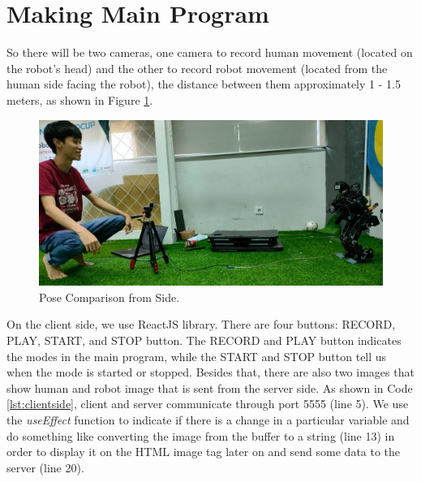 \section{Making Main Program}
\label{sec:makingmainprogram}

So there will be two cameras, one camera to record human movement (located on the robot's head) and the other to record robot movement (located from the human side facing the robot), the distance between them approximately 1 - 1.5 meters, as shown in Figure \ref{fig:posecomparisonside}.

\begin{figure}[ht]
  \centering
  \includegraphics[scale=0.32]{gambar/pose-comparison.jpeg}
  \caption{Pose Comparison from Side.}
  \label{fig:posecomparisonside}
\end{figure}

On the client side, we use ReactJS library. There are four buttons: RECORD, PLAY, START, and STOP button. The RECORD and PLAY button indicates the modes in the main program, while the START and STOP button tell us when the mode is started or stopped.
Besides that, there are also two images that show human and robot image that is sent from the server side. As shown in Code \ref{lst:clientside}, client and server communicate through port 5555 (line 5).
We use the \emph{useEffect} function to indicate if there is a change in a particular variable and do something like converting the image from the buffer to a string (line 13) in order to display it on the HTML image tag later on and send some data to the server (line 20).


